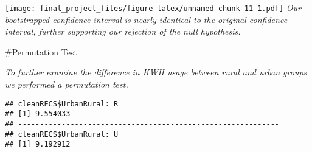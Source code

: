 \documentclass[
]{article}
\newenvironment{Shaded}{\begin{snugshade}}{\end{snugshade}}
\newcommand{\AttributeTok}[1]{\textcolor[rgb]{0.77,0.63,0.00}{#1}}
\newcommand{\CommentTok}[1]{\textcolor[rgb]{0.56,0.35,0.01}{\textit{#1}}}
\newcommand{\DecValTok}[1]{\textcolor[rgb]{0.00,0.00,0.81}{#1}}
\newcommand{\FunctionTok}[1]{\textcolor[rgb]{0.00,0.00,0.00}{#1}}
\newcommand{\NormalTok}[1]{#1}
\newcommand{\OtherTok}[1]{\textcolor[rgb]{0.56,0.35,0.01}{#1}}
\newcommand{\SpecialCharTok}[1]{\textcolor[rgb]{0.00,0.00,0.00}{#1}}
\newcommand{\StringTok}[1]{\textcolor[rgb]{0.31,0.60,0.02}{#1}}
\begin{document}
\begin{Shaded}
\end{Shaded}

\texttt{[image: final\_project\_files/figure-latex/unnamed-chunk-11-1.pdf]}
\emph{Our bootstrapped confidence interval is nearly identical to the
original confidence interval, further supporting our rejection of the
null hypothesis.}

\#Permutation Test

\emph{To further examine the difference in KWH usage between rural and
urban groups we performed a permutation test.}

\begin{Shaded}
\end{Shaded}

\begin{verbatim}
## cleanRECS$UrbanRural: R
## [1] 9.554033
## ------------------------------------------------------------ 
## cleanRECS$UrbanRural: U
## [1] 9.192912
\end{verbatim}
\end{document}
